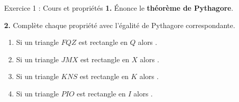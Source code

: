 

\begin{exercisebox}{ Exercice 1 : Cours et propriétés }
  \textbf{1.} Énonce le \textbf{théorème de Pythagore}. 


  \smallspace

  \textbf{2.} Complète chaque propriété avec l’égalité de Pythagore correspondante. 
  \begin{enumerate}[label=\alph*)]
    \item Si un triangle $FQZ$ est rectangle en $Q$ alors\;\onlyeleve{\underline{\hspace{2.2cm}} + \underline{\hspace{2.2cm}} = \underline{\hspace{2.2cm}}} .
    \item Si un triangle $JMX$ est rectangle en $X$ alors\;\onlyeleve{\underline{\hspace{2.2cm}} + \underline{\hspace{2.2cm}} = \underline{\hspace{2.2cm}}} .
    \item Si un triangle $KNS$ est rectangle en $K$ alors\;\onlyeleve{\underline{\hspace{2.2cm}} + \underline{\hspace{2.2cm}} = \underline{\hspace{2.2cm}}} .
    \item Si un triangle $PIO$ est rectangle en $I$ alors\;\onlyeleve{\underline{\hspace{2.2cm}} + \underline{\hspace{2.2cm}} = \underline{\hspace{2.2cm}}} .
  \end{enumerate}


\end{exercisebox}
